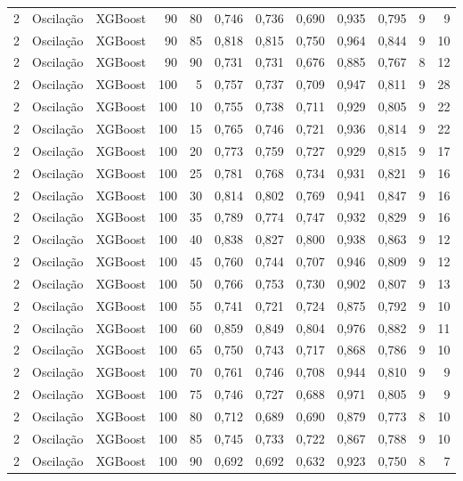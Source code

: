 \begin{longtable}{@{}rllrrrrrrrrr@{}}
2 & Oscilação & XGBoost & 90 & 80 & 0,746 & 0,736 & 0,690 & 0,935 & 0,795 & 9 & 9 \\
2 & Oscilação & XGBoost & 90 & 85 & 0,818 & 0,815 & 0,750 & 0,964 & 0,844 & 9 & 10 \\
2 & Oscilação & XGBoost & 90 & 90 & 0,731 & 0,731 & 0,676 & 0,885 & 0,767 & 8 & 12 \\
2 & Oscilação & XGBoost & 100 & 5 & 0,757 & 0,737 & 0,709 & 0,947 & 0,811 & 9 & 28 \\
2 & Oscilação & XGBoost & 100 & 10 & 0,755 & 0,738 & 0,711 & 0,929 & 0,805 & 9 & 22 \\
2 & Oscilação & XGBoost & 100 & 15 & 0,765 & 0,746 & 0,721 & 0,936 & 0,814 & 9 & 22 \\
2 & Oscilação & XGBoost & 100 & 20 & 0,773 & 0,759 & 0,727 & 0,929 & 0,815 & 9 & 17 \\
2 & Oscilação & XGBoost & 100 & 25 & 0,781 & 0,768 & 0,734 & 0,931 & 0,821 & 9 & 16 \\
2 & Oscilação & XGBoost & 100 & 30 & 0,814 & 0,802 & 0,769 & 0,941 & 0,847 & 9 & 16 \\
2 & Oscilação & XGBoost & 100 & 35 & 0,789 & 0,774 & 0,747 & 0,932 & 0,829 & 9 & 16 \\
2 & Oscilação & XGBoost & 100 & 40 & 0,838 & 0,827 & 0,800 & 0,938 & 0,863 & 9 & 12 \\
2 & Oscilação & XGBoost & 100 & 45 & 0,760 & 0,744 & 0,707 & 0,946 & 0,809 & 9 & 12 \\
2 & Oscilação & XGBoost & 100 & 50 & 0,766 & 0,753 & 0,730 & 0,902 & 0,807 & 9 & 13 \\
2 & Oscilação & XGBoost & 100 & 55 & 0,741 & 0,721 & 0,724 & 0,875 & 0,792 & 9 & 10 \\
2 & Oscilação & XGBoost & 100 & 60 & 0,859 & 0,849 & 0,804 & 0,976 & 0,882 & 9 & 11 \\
2 & Oscilação & XGBoost & 100 & 65 & 0,750 & 0,743 & 0,717 & 0,868 & 0,786 & 9 & 10 \\
2 & Oscilação & XGBoost & 100 & 70 & 0,761 & 0,746 & 0,708 & 0,944 & 0,810 & 9 & 9 \\
2 & Oscilação & XGBoost & 100 & 75 & 0,746 & 0,727 & 0,688 & 0,971 & 0,805 & 9 & 9 \\
2 & Oscilação & XGBoost & 100 & 80 & 0,712 & 0,689 & 0,690 & 0,879 & 0,773 & 8 & 10 \\
2 & Oscilação & XGBoost & 100 & 85 & 0,745 & 0,733 & 0,722 & 0,867 & 0,788 & 9 & 10 \\
2 & Oscilação & XGBoost & 100 & 90 & 0,692 & 0,692 & 0,632 & 0,923 & 0,750 & 8 & 7 \\

\end{longtable}
